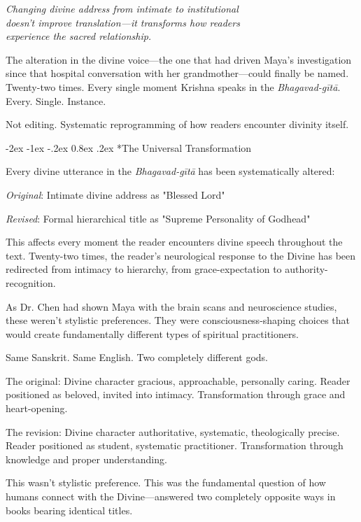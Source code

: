 \documentclass[12pt,twoside]{book}
\makeatletter
\let\oldsubsection\subsection
\renewcommand{\subsection}[1]{\needspace{3\baselineskip}\oldsubsection{#1}}
\renewcommand\subsection{\@startsection{subsection}{2}{\z@}%
{-2ex \@plus -1ex \@minus -.2ex}%
{0.8ex \@plus .2ex}%
{\normalfont\large\bfseries}}
\makeatother
\begin{document}
{\centering\itshape Changing divine address from intimate to institutional\\doesn't improve translation—it transforms how readers\\experience the sacred relationship.\par}
\vspace{0.1cm}

\normalfont\justifying
The alteration in the divine voice—the one that had driven Maya's investigation since that hospital conversation with her grandmother—could finally be named. Twenty-two times. Every single moment Krishna speaks in the \emph{Bhagavad-gītā}. Every. Single. Instance.

Not editing. Systematic reprogramming of how readers encounter divinity itself.

\vspace{0.1cm}
\subsection*{The Universal Transformation}


Every divine utterance in the \emph{Bhagavad-gītā} has been systematically altered:

\emph{Original}: Intimate divine address as "Blessed Lord"

\emph{Revised}: Formal hierarchical title as "Supreme Personality of Godhead"

This affects every moment the reader encounters divine speech throughout the text. Twenty-two times, the reader's neurological response to the Divine has been redirected from intimacy to hierarchy, from grace-expectation to authority-recognition.

As Dr. Chen had shown Maya with the brain scans and neuroscience studies, these weren't stylistic preferences. They were consciousness-shaping choices that would create fundamentally different types of spiritual practitioners.

Same Sanskrit. Same English. Two completely different gods.

The original: Divine character gracious, approachable, personally caring. Reader positioned as beloved, invited into intimacy. Transformation through grace and heart-opening.

The revision: Divine character authoritative, systematic, theologically precise. Reader positioned as student, systematic practitioner. Transformation through knowledge and proper understanding.

This wasn't stylistic preference. This was the fundamental question of how humans connect with the Divine—answered two completely opposite ways in books bearing identical titles.
\end{document}
